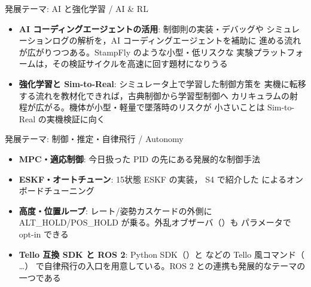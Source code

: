 \begin{frame}{発展テーマ: AI と強化学習 / AI \& RL}
  \begin{itemize}\small
    \item \textbf{AI コーディングエージェントの活用}: 制御則の実装・デバッグや
          シミュレーションログの解析を，AI コーディングエージェントを補助に
          進める流れが広がりつつある。StampFly のような小型・低リスクな
          実験プラットフォームは，その検証サイクルを高速に回す題材になりうる
    \item \textbf{強化学習と Sim-to-Real}: シミュレータ上で学習した制御方策を
          実機に転移する流れを教材化できれば，古典制御から学習型制御へ
          カリキュラムの射程が広がる。機体が小型・軽量で墜落時のリスクが
          小さいことは Sim-to-Real の実機検証に向く
  \end{itemize}
\end{frame}

\begin{frame}{発展テーマ: 制御・推定・自律飛行 / Autonomy}
  \begin{itemize}\small
    \item \textbf{MPC・適応制御}: 今日扱った PID の先にある発展的な制御手法
    \item \textbf{ESKF・オートチューン}: 15状態 ESKF の実装，
          S4 で紹介した  によるオンボードチューニング
    \item \textbf{高度・位置ループ}: レート/姿勢カスケードの外側に
          ALT\_HOLD/POS\_HOLD が乗る。外乱オブザーバ（）も
          パラメータで opt-in できる
    \item \textbf{Tello 互換 SDK と ROS 2}: Python SDK（）と
           などの Tello 風コマンド（ …）
          で自律飛行の入口を用意している。ROS 2 との連携も発展的なテーマの一つである
  \end{itemize}
\end{frame}

